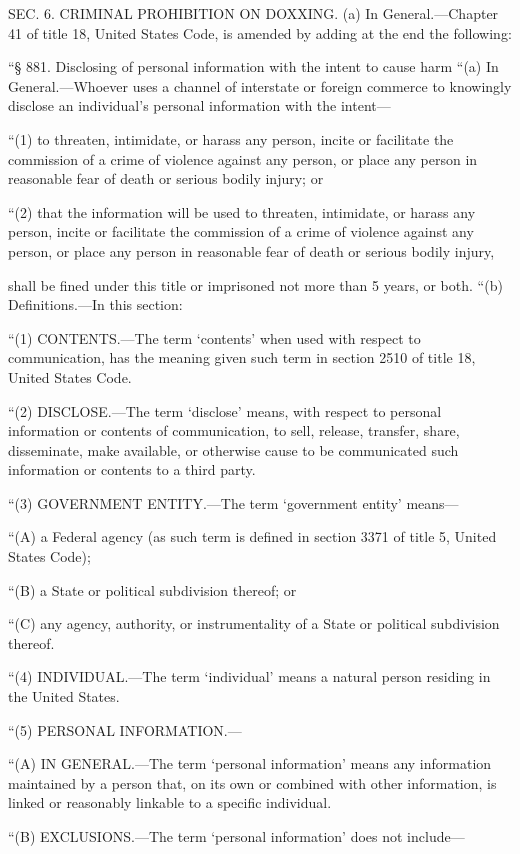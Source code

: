 SEC. 6. CRIMINAL PROHIBITION ON DOXXING.
(a) In General.—Chapter 41 of title 18, United States Code, is amended by adding at the end the following:


“§ 881. Disclosing of personal information with the intent to cause harm
“(a) In General.—Whoever uses a channel of interstate or foreign commerce to knowingly disclose an individual’s personal information with the intent—

“(1) to threaten, intimidate, or harass any person, incite or facilitate the commission of a crime of violence against any person, or place any person in reasonable fear of death or serious bodily injury; or

“(2) that the information will be used to threaten, intimidate, or harass any person, incite or facilitate the commission of a crime of violence against any person, or place any person in reasonable fear of death or serious bodily injury,

shall be fined under this title or imprisoned not more than 5 years, or both.
“(b) Definitions.—In this section:

“(1) CONTENTS.—The term ‘contents’ when used with respect to communication, has the meaning given such term in section 2510 of title 18, United States Code.

“(2) DISCLOSE.—The term ‘disclose’ means, with respect to personal information or contents of communication, to sell, release, transfer, share, disseminate, make available, or otherwise cause to be communicated such information or contents to a third party.

“(3) GOVERNMENT ENTITY.—The term ‘government entity’ means—

“(A) a Federal agency (as such term is defined in section 3371 of title 5, United States Code);

“(B) a State or political subdivision thereof; or

“(C) any agency, authority, or instrumentality of a State or political subdivision thereof.

“(4) INDIVIDUAL.—The term ‘individual’ means a natural person residing in the United States.

“(5) PERSONAL INFORMATION.—

“(A) IN GENERAL.—The term ‘personal information’ means any information maintained by a person that, on its own or combined with other information, is linked or reasonably linkable to a specific individual.

“(B) EXCLUSIONS.—The term ‘personal information’ does not include—

